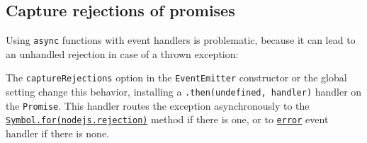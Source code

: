 \subsection{Capture rejections of
promises}\label{capture-rejections-of-promises}

Using \texttt{async} functions with event handlers is problematic,
because it can lead to an unhandled rejection in case of a thrown
exception:

\begin{Shaded}
\begin{Highlighting}[]
\NormalTok{ \{ }\NormalTok{ \} } \OperatorTok{;}
\OperatorTok{=}  \NormalTok{()}\OperatorTok{;}
\NormalTok{(}\OperatorTok{,} \KeywordTok{=\textgreater{}}\NormalTok{ \{}
    \NormalTok{(}\NormalTok{)}\OperatorTok{;}
\NormalTok{\})}\OperatorTok{;}
\end{Highlighting}
\end{Shaded}

\begin{Shaded}
\begin{Highlighting}[]
  \OperatorTok{=} \NormalTok{(}\NormalTok{)}\OperatorTok{;}
\OperatorTok{=}  \NormalTok{()}\OperatorTok{;}
\NormalTok{(}\OperatorTok{,} \KeywordTok{=\textgreater{}}\NormalTok{ \{}
    \NormalTok{(}\NormalTok{)}\OperatorTok{;}
\NormalTok{\})}\OperatorTok{;}
\end{Highlighting}
\end{Shaded}

The \texttt{captureRejections} option in the \texttt{EventEmitter}
constructor or the global setting change this behavior, installing a
\texttt{.then(undefined,\ handler)} handler on the \texttt{Promise}.
This handler routes the exception asynchronously to the
\hyperref[emittersymbolfornodejsrejectionerr-eventname-args]{\texttt{Symbol.for(\textquotesingle{}nodejs.rejection\textquotesingle{})}}
method if there is one, or to
\hyperref[error-events]{\texttt{\textquotesingle{}error\textquotesingle{}}}
event handler if there is none.


